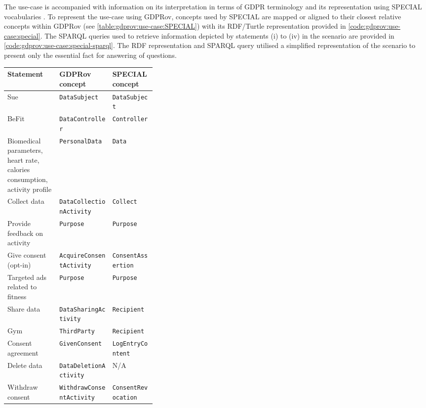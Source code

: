 The use-case is accompanied with information on its interpretation in terms of GDPR terminology \cite{bonatti_d1.7_2018} and its representation using  SPECIAL vocabularies \cite{kirrane_scalable_2018}. To represent the use-case using GDPRov, concepts used by SPECIAL are mapped or aligned to their closest relative concepts within GDPRov (see \autoref{table:gdprov:use-case:SPECIAL}) with its RDF/Turtle representation provided in \autoref{code:gdprov:use-case:special}. The SPARQL queries used to retrieve information depicted by statements (i) to (iv) in the scenario are provided in \autoref{code:gdprov:use-case:special-sparql}. The RDF representation and SPARQL query utilised a simplified representation of the scenario to present only the essential fact for answering of questions. 
\begin{center}
    \footnotesize
\begin{tabularx}{\textwidth}{|p{0.35\linewidth}|X|X|}
\caption{GDPRov concepts to represent external use-case from SPECIAL} \label{table:gdprov:use-case:SPECIAL} \\
\toprule
\textbf{Statement} & \textbf{GDPRov concept} & \textbf{SPECIAL concept} \\
\midrule
\endhead
Sue & \texttt{DataSubject} & \texttt{DataSubject} \\ \hline
BeFit & \texttt{DataController} & \texttt{Controller} \\ \hline
Biomedical parameters, heart rate, calories consumption, activity profile & \texttt{PersonalData} & \texttt{Data} \\ \hline
Collect data & \texttt{DataCollectionActivity} & \texttt{Collect} \\ \hline
Provide feedback on activity & \texttt{Purpose} & \texttt{Purpose} \\ \hline
Give consent (opt-in) & \texttt{AcquireConsentActivity} & \texttt{ConsentAssertion} \\ \hline
Targeted ads related to fitness & \texttt{Purpose} & \texttt{Purpose} \\ \hline
Share data & \texttt{DataSharingActivity} & \texttt{Recipient} \\ \hline
Gym & \texttt{ThirdParty} & \texttt{Recipient} \\ \hline
Consent agreement & \texttt{GivenConsent} & \texttt{LogEntryContent} \\ \hline
Delete data & \texttt{DataDeletionActivity} & N/A \\ \hline
Withdraw consent & \texttt{WithdrawConsentActivity} & \texttt{ConsentRevocation} \\
\bottomrule
\end{tabularx}
\end{center}
